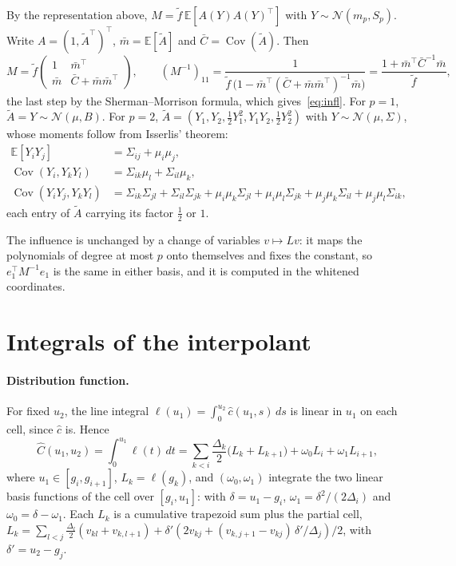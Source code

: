 \documentclass[11pt]{article}
\newcommand{\E}{\mathbb{E}}
\newcommand{\N}{\mathcal{N}}
\begin{document}
By the representation above, $M = \tilde f\, \E[A(Y) A(Y)^\top]$ with
$Y \sim \N(m_p, S_p)$. Write $A = (1, \tilde A^\top)^\top$, $\bar m =
\E[\tilde A]$ and $\bar C = \operatorname{Cov}(\tilde A)$. Then
\[
  M = \tilde f \begin{pmatrix} 1 & \bar m^\top \\
                               \bar m & \bar C + \bar m \bar m^\top
               \end{pmatrix},
  \qquad
  (M^{-1})_{11} = \frac{1}{\tilde f\,\bigl(1 - \bar m^\top (\bar C + \bar m
                  \bar m^\top)^{-1} \bar m\bigr)}
                = \frac{1 + \bar m^\top \bar C^{-1} \bar m}{\tilde f},
\]
the last step by the Sherman--Morrison formula, which gives~\eqref{eq:infl}.
For $p = 1$, $\tilde A = Y \sim \N(\mu, B)$. For $p = 2$, $\tilde A = (Y_1,
Y_2, \frac12 Y_1^2, Y_1 Y_2, \frac12 Y_2^2)$ with $Y \sim \N(\mu, \Sigma)$,
whose moments follow from Isserlis' theorem:
\begin{align*}
  \E[Y_i Y_j] &= \Sigma_{ij} + \mu_i \mu_j, \\
  \operatorname{Cov}(Y_i, Y_k Y_l) &= \Sigma_{ik} \mu_l + \Sigma_{il} \mu_k, \\
  \operatorname{Cov}(Y_i Y_j, Y_k Y_l) &= \Sigma_{ik}\Sigma_{jl}
    + \Sigma_{il}\Sigma_{jk} + \mu_i \mu_k \Sigma_{jl} + \mu_i \mu_l \Sigma_{jk}
    + \mu_j \mu_k \Sigma_{il} + \mu_j \mu_l \Sigma_{ik},
\end{align*}
each entry of $\tilde A$ carrying its factor $\frac12$ or $1$.

The influence is unchanged by a change of variables $v \mapsto L v$: it maps
the polynomials of degree at most $p$ onto themselves and fixes the constant,
so $e_1^\top M^{-1} e_1$ is the same in either basis, and it is computed in the
whitened coordinates.

\section{Integrals of the interpolant}
\label{app:interpolant}

\paragraph{Distribution function.} For fixed $u_2$, the line integral
$\ell(u_1) = \int_0^{u_2} \hat c(u_1, s)\, ds$ is linear in $u_1$ on each cell,
since $\hat c$ is. Hence
\[
  \hat C(u_1, u_2) = \int_0^{u_1} \ell(t)\, dt
  = \sum_{k < i} \frac{\Delta_k}{2} \bigl(L_k + L_{k+1}\bigr)
    + \omega_0 L_i + \omega_1 L_{i+1},
\]
where $u_1 \in [g_i, g_{i+1}]$, $L_k = \ell(g_k)$, and $(\omega_0, \omega_1)$
integrate the two linear basis functions of the cell over $[g_i, u_1]$:
with $\delta = u_1 - g_i$, $\omega_1 = \delta^2 / (2\Delta_i)$ and
$\omega_0 = \delta - \omega_1$. Each $L_k$ is a cumulative trapezoid sum
plus the partial cell, $L_k = \sum_{l < j} \frac{\Delta_l}{2}(v_{kl} +
v_{k,l+1}) + \delta' (2 v_{kj} + (v_{k,j+1} - v_{kj})\,\delta'/\Delta_j)/2$,
with $\delta' = u_2 - g_j$.
\end{document}

